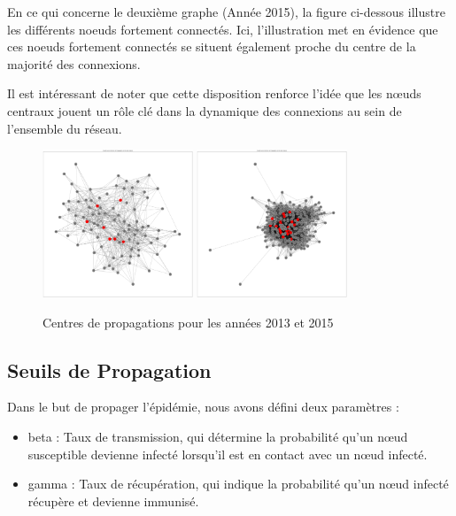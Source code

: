 \documentclass{article}
\begin{document}
En ce qui concerne le deuxième graphe (Année 2015), la figure ci-dessous illustre les différents noeuds fortement connectés. Ici, l'illustration met en évidence que ces noeuds fortement connectés se situent également proche du centre de la majorité des connexions.

Il est intéressant de noter que cette disposition renforce l'idée que les nœuds centraux jouent un rôle clé dans la dynamique des connexions au sein de l'ensemble du réseau.

\begin{figure}[!h]
    \centering
    \includegraphics[width=0.40\textwidth]{assets/epidemiologie/centre_propa_2013}
    \hfill
    \includegraphics[width=0.40\textwidth]{assets/epidemiologie/centre_propa_2015}
    \caption{Centres de propagations pour les années 2013 et 2015}
    \label{fig:centre_propa_parallel}
\end{figure}

\subsection{Seuils de Propagation}

\noindent
Dans le but de propager l'épidémie, nous avons défini deux paramètres :
\begin{itemize}
    \item beta : Taux de transmission, qui détermine la probabilité qu'un nœud susceptible devienne infecté lorsqu'il est en contact avec un nœud infecté.
    \item gamma : Taux de récupération, qui indique la probabilité qu'un nœud infecté récupère et devienne immunisé. \\
\end{itemize}
\end{document}
